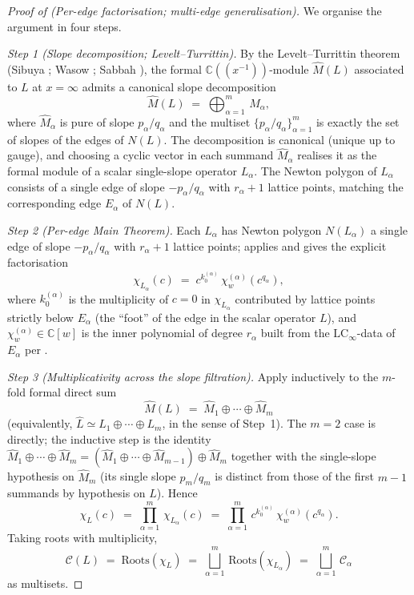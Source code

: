 \documentclass[11pt,a4paper]{article}
\theoremstyle{plain}
\theoremstyle{definition}
\theoremstyle{remark}
\newcommand{\LCinf}{\mathrm{LC}_\infty}
\newcommand{\Roots}{\mathrm{Roots}}
\newcommand{\Cl}{\mathcal{C}}
\begin{document}
\begin{proof}[Proof of  (Per-edge factorisation; multi-edge
generalisation)]
We organise the argument in four steps.

\smallskip
\textit{Step 1 (Slope decomposition; Levelt--Turrittin).}
By the Levelt--Turrittin theorem (Sibuya \cite{sibuya};
Wasow \cite[Ch.~VII]{wasow}; Sabbah \cite[Ch.~II,
Thm.~II.2.4]{sabbah-isomon}), the formal $\mathbb{C}((x^{-1}))$-module
$\widehat{M}(L)$ associated to $L$ at $x = \infty$ admits a canonical
slope decomposition
\[
   \widehat{M}(L) \;=\; \bigoplus_{\alpha=1}^{m}\,
   \widehat{M}_\alpha,
\]
where $\widehat{M}_\alpha$ is pure of slope $p_\alpha/q_\alpha$ and
the multiset $\{p_\alpha/q_\alpha\}_{\alpha=1}^{m}$ is exactly the set
of slopes of the edges of $N(L)$. The decomposition is canonical
(unique up to gauge), and choosing a cyclic vector in each summand
$\widehat{M}_\alpha$ realises it as the formal module of a scalar
single-slope operator $L_\alpha$. The Newton polygon of $L_\alpha$
consists of a single edge of slope $-p_\alpha/q_\alpha$ with
$r_\alpha + 1$ lattice points, matching the corresponding edge
$E_\alpha$ of $N(L)$.

\smallskip
\textit{Step 2 (Per-edge Main Theorem).}
Each $L_\alpha$ has Newton polygon $N(L_\alpha)$ a single edge of
slope $-p_\alpha/q_\alpha$ with $r_\alpha + 1$ lattice points;
 applies and gives the explicit factorisation
\[
   \chi_{L_\alpha}(c)
   \;=\;
   c^{k_0^{(\alpha)}}\, \chi_w^{(\alpha)}(c^{q_\alpha}),
\]
where $k_0^{(\alpha)}$ is the multiplicity of $c = 0$ in $\chi_{L_\alpha}$
contributed by lattice points strictly below $E_\alpha$ (the
``foot'' of the edge in the scalar operator $L$), and
$\chi_w^{(\alpha)} \in \mathbb{C}[w]$ is the inner polynomial of
degree $r_\alpha$ built from the $\LCinf$-data of $E_\alpha$ per
.

\smallskip
\textit{Step 3 (Multiplicativity across the slope filtration).}
Apply  inductively to the $m$-fold
formal direct sum
\[
   \widehat{M}(L) \;=\; \widehat{M}_1 \oplus \cdots \oplus \widehat{M}_m
\]
(equivalently, $\widehat{L} \simeq L_1 \oplus \cdots \oplus L_m$, in
the sense of Step~1). The $m = 2$ case is 
directly; the inductive step is the identity $\widehat{M}_1 \oplus
\cdots \oplus \widehat{M}_m = (\widehat{M}_1 \oplus \cdots \oplus
\widehat{M}_{m-1}) \oplus \widehat{M}_m$ together with the
single-slope hypothesis on $\widehat{M}_m$ (its single slope
$p_m/q_m$ is distinct from those of the first $m - 1$ summands by
hypothesis on $L$). Hence
\[
   \chi_L(c)
   \;=\;
   \prod_{\alpha=1}^{m}\, \chi_{L_\alpha}(c)
   \;=\;
   \prod_{\alpha=1}^{m}\,
   c^{k_0^{(\alpha)}}\, \chi_w^{(\alpha)}(c^{q_\alpha}).
\]
Taking roots with multiplicity,
\[
   \Cl(L) \;=\; \Roots(\chi_L)
   \;=\;
   \bigsqcup_{\alpha = 1}^{m}\, \Roots(\chi_{L_\alpha})
   \;=\;
   \bigsqcup_{\alpha = 1}^{m}\, \Cl_\alpha
\]
as multisets.


\end{proof}
\end{document}
